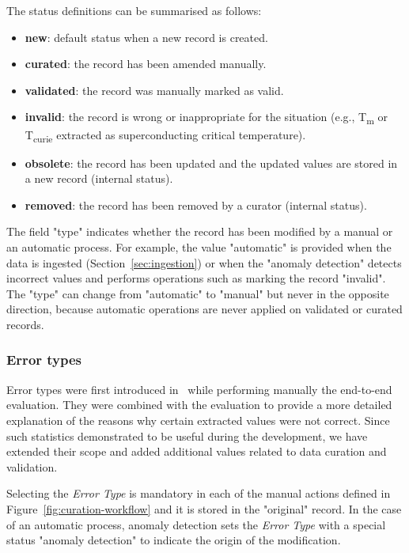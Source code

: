 \documentclass[a4paper]{article}
\begin{document}
The status definitions can be summarised as follows: 
\begin{itemize}
    \item \textbf{new}: default status when a new record is created.
    \item \textbf{curated}: the record has been amended manually.
    \item \textbf{validated}: the record was manually marked as valid.
    \item \textbf{invalid}: the record is wrong or inappropriate for the situation (e.g., T\textsubscript{m} or T\textsubscript{curie} extracted as superconducting critical temperature).
    \item \textbf{obsolete}: the record has been updated and the updated values are stored in a new record (internal status).
    \item \textbf{removed}: the record has been removed by a curator (internal status).
\end{itemize}
    
The field "type" indicates whether the record has been modified by a manual or an automatic process. 
For example, the value "automatic" is provided when the data is ingested (Section~\ref{sec:ingestion}) or when the "anomaly detection" detects incorrect values and performs operations such as marking the record "invalid". 
The "type" can change from "automatic" to "manual" but never in the opposite direction, because automatic operations are never applied on validated or curated records.

\subsubsection{Error types}
\label{subsec:error-types}
Error types were first introduced in~\cite{lfoppiano2023automatic} while performing manually the end-to-end evaluation. 
They were combined with the evaluation to provide a more detailed explanation of the reasons why certain extracted values were not correct. 
Since such statistics demonstrated to be useful during the development, we have extended their scope and added additional values related to data curation and validation. 

Selecting the \emph{Error Type} is mandatory in each of the manual actions defined in Figure~\ref{fig:curation-workflow} and it is stored in the "original" record. In the case of an automatic process, anomaly detection sets the \emph{Error Type} with a special status "anomaly detection" to indicate the origin of the modification. 
\end{document}
